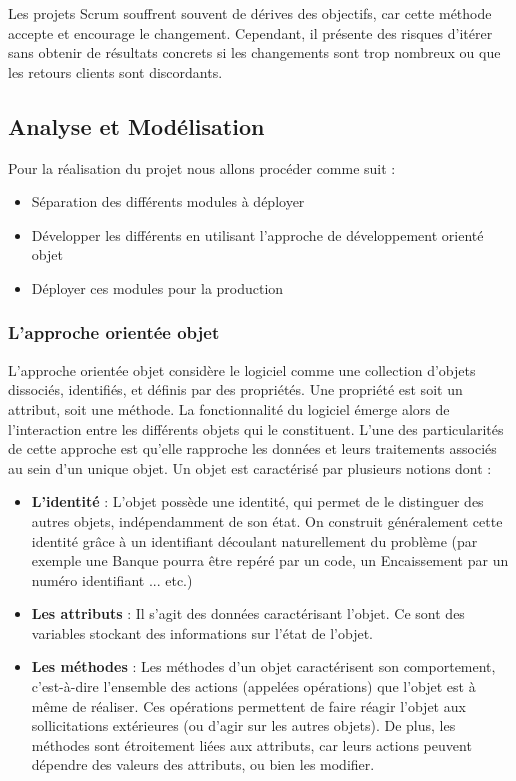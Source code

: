 Les projets Scrum souffrent souvent de dérives des objectifs, car cette méthode accepte et encourage le changement. Cependant, il présente des risques d’itérer sans obtenir de résultats concrets si les changements sont trop nombreux ou que les retours clients sont discordants.

\subsection{Analyse et Modélisation}

Pour la réalisation du projet nous allons procéder comme suit :

\vspace{1em}
\begin{itemize}
	\setlength\itemsep{1em}
	\item Séparation des différents modules à déployer
	\item Développer les différents en utilisant l'approche de développement orienté objet
	\item Déployer ces modules pour la production
\end{itemize}

\subsubsection{L’approche orientée objet}

L’approche orientée objet considère le logiciel comme une collection d’objets dissociés,
identifiés, et définis par des propriétés. Une propriété est soit un attribut, soit une méthode.
La fonctionnalité du logiciel émerge alors de l’interaction entre les différents objets qui le
constituent. L’une des particularités de cette approche est qu’elle rapproche les données et
leurs traitements associés au sein d’un unique objet. Un objet est caractérisé par plusieurs
notions dont :

\vspace{1em}
\begin{itemize}
	\setlength\itemsep{1em}
	\item \textbf{L’identité} : L’objet possède une identité, qui permet de le distinguer des autres objets, indépendamment de son état. On construit généralement cette identité grâce à un identifiant
	      découlant naturellement du problème (par exemple une Banque pourra être repéré par un code,
	      un Encaissement par un numéro identifiant ... etc.)
	\item \textbf{Les attributs} : Il s’agit des données caractérisant l’objet. Ce sont des variables stockant des
	      informations sur l’état de l’objet.
	\item \textbf{Les méthodes} : Les méthodes d’un objet caractérisent son comportement, c’est-à-dire l’ensemble
	      des actions (appelées opérations) que l’objet est à même de réaliser. Ces opérations permettent
	      de faire réagir l’objet aux sollicitations extérieures (ou d’agir sur les autres objets). De plus, les
	      méthodes sont étroitement liées aux attributs, car leurs actions peuvent dépendre des valeurs
	      des attributs, ou bien les modifier.
\end{itemize}

